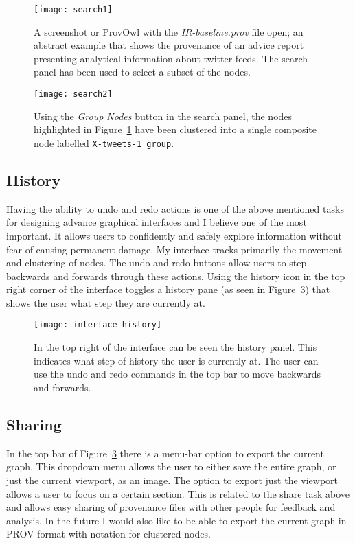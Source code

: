 \begin{figure}[h]
	\centering
	\texttt{[image: search1]}
	\caption{A screenshot or ProvOwl with the \textit{IR-baseline.prov} file open; an abstract example that shows the provenance of an advice report presenting analytical information about twitter feeds. The search panel has been used to select a subset of the nodes.}
	\label{fig:search1}
\end{figure}
\begin{figure}[h]
	\centering
	\texttt{[image: search2]}
	\caption{Using the \textit{Group Nodes} button in the search panel, the nodes highlighted in Figure~\ref{fig:search1} have been clustered into a single composite node labelled \texttt{X-tweets-1 group}.}
	\label{fig:search2}
\end{figure}

\clearpage

\subsection{History}
\label{sec:history}

Having the ability to undo and redo actions is one of the above mentioned tasks for designing advance graphical interfaces and I believe one of the most important. It allows users to confidently and safely explore information without fear of causing permanent damage. My interface tracks primarily the movement and clustering of nodes. The undo and redo buttons allow users to step backwards and forwards through these actions. Using the history icon in the top right corner of the interface toggles a history pane (as seen in Figure~\ref{fig:interface-history}) that shows the user what step they are currently at. 

\begin{figure}[h]
	\centering
	\texttt{[image: interface-history]}
	\caption{In the top right of the interface can be seen the history panel. This indicates what step of history the user is currently at. The user can use the undo and redo commands in the top bar to move backwards and forwards.}
	\label{fig:interface-history}
\end{figure}

\subsection{Sharing}
\label{sec:sharing}

In the top bar of Figure~\ref{fig:interface-history} there is a menu-bar option to export the current graph. This dropdown menu allows the user to either save the entire graph, or just the current viewport, as an image. The option to export just the viewport allows a user to focus on a certain section. This is related to the share task above and allows easy sharing of provenance files with other people for feedback and analysis. In the future I would also like to be able to export the current graph in PROV format with notation for clustered nodes.

